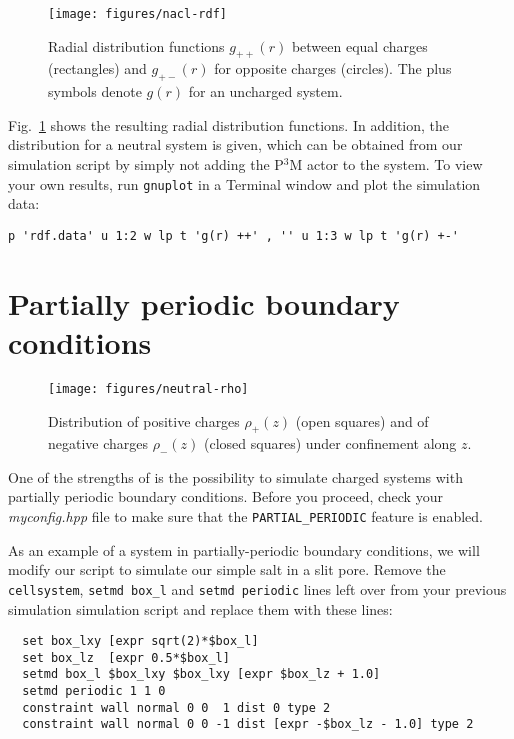 \documentclass[
a4paper,                        %
11pt,                           %
twoside,                        %
footsepline,                    %
headsepline,                    %
headexclude,                    %
footexclude,                    %
pagesize,                       %
]{scrartcl}
\begin{document}
\begin{figure}[tb]
  \centering
  \texttt{[image: figures/nacl-rdf]}
  \caption{Radial distribution functions $g_{++}(r)$ between equal
    charges (rectangles) and $g_{+-}(r)$ for opposite charges
    (circles). The plus symbols denote $g(r)$ for an uncharged
    system.}
  \label{fig:rdf}
\end{figure}

Fig.~\ref{fig:rdf} shows the resulting radial distribution functions. In
addition, the distribution for a neutral system is given, which can be obtained
from our simulation script by simply not adding the P$^3$M actor to the system.
To view your own results, run \verb|gnuplot| in a Terminal window
and plot the simulation data:

\begin{lstlisting}
p 'rdf.data' u 1:2 w lp t 'g(r) ++' , '' u 1:3 w lp t 'g(r) +-'
\end{lstlisting}

\iffalse
\section{Partially periodic boundary conditions}

\begin{figure}[h]
  \centering
  \texttt{[image: figures/neutral-rho]}
  \caption{Distribution of positive charges $\rho_+(z)$ (open squares)
    and of negative charges $\rho_-(z)$ (closed squares) under
    confinement along $z$.}
  \label{fig:neutralrho}
\end{figure}

One of the strengths of \es{} is the possibility to simulate charged
systems with partially periodic boundary conditions.
Before you proceed, check your \emph{myconfig.hpp} file to make
sure that the \verb|PARTIAL_PERIODIC| feature is enabled.

As an example of a system in partially-periodic boundary conditions,
we will modify our script to simulate our simple salt in a slit pore.
Remove the \verb|cellsystem|, \verb|setmd box_l| and \verb|setmd periodic| lines left
over from your previous simulation simulation script and replace them
with these lines:

\begin{lstlisting}
  set box_lxy [expr sqrt(2)*$box_l]
  set box_lz  [expr 0.5*$box_l]
  setmd box_l $box_lxy $box_lxy [expr $box_lz + 1.0]
  setmd periodic 1 1 0
  constraint wall normal 0 0  1 dist 0 type 2
  constraint wall normal 0 0 -1 dist [expr -$box_lz - 1.0] type 2
\end{lstlisting}
\end{document}

